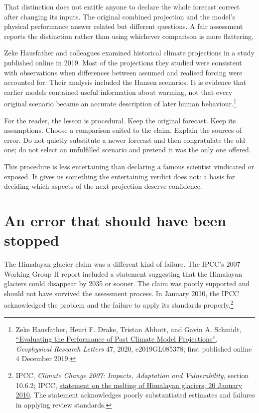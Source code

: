 \documentclass[12pt,a4paper]{book}
\begin{document}
That distinction does not entitle anyone to declare the whole forecast correct after changing its inputs. The original combined projection and the model's physical performance answer related but different questions. A fair assessment reports the distinction rather than using whichever comparison is more flattering.

Zeke Hausfather and colleagues examined historical climate projections in a study published online in 2019. Most of the projections they studied were consistent with observations when differences between assumed and realised forcing were accounted for. Their analysis included the Hansen scenarios. It is evidence that earlier models contained useful information about warming, not that every original scenario became an accurate description of later human behaviour.\footnote{Zeke Hausfather, Henri F. Drake, Tristan Abbott, and Gavin A. Schmidt, \href{https://agupubs.onlinelibrary.wiley.com/doi/10.1029/2019GL085378}{``Evaluating the Performance of Past Climate Model Projections''}, \emph{Geophysical Research Letters} 47, 2020, e2019GL085378; first published online 4 December 2019.}

For the reader, the lesson is procedural. Keep the original forecast. Keep its assumptions. Choose a comparison suited to the claim. Explain the sources of error. Do not quietly substitute a newer forecast and then congratulate the old one; do not select an unfulfilled scenario and pretend it was the only one offered.

This procedure is less entertaining than declaring a famous scientist vindicated or exposed. It gives us something the entertaining verdict does not: a basis for deciding which aspects of the next projection deserve confidence.

\section*{An error that should have been stopped}

The Himalayan glacier claim was a different kind of failure. The IPCC's 2007 Working Group II report included a statement suggesting that the Himalayan glaciers could disappear by 2035 or sooner. The claim was poorly supported and should not have survived the assessment process. In January 2010, the IPCC acknowledged the problem and the failure to apply its standards properly.\footnote{IPCC, \emph{Climate Change 2007: Impacts, Adaptation and Vulnerability}, section 10.6.2; IPCC, \href{https://archive.ipcc.ch/pdf/presentations/himalaya-statement-20january2010.pdf}{statement on the melting of Himalayan glaciers, 20 January 2010}. The statement acknowledges poorly substantiated estimates and failures in applying review standards.}
\end{document}
